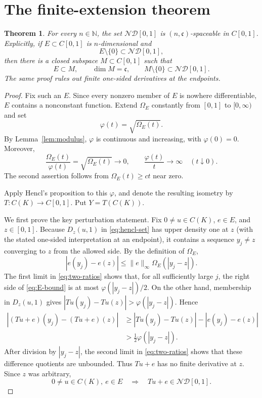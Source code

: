 \documentclass[11pt]{article}
\newtheorem{theorem}{Theorem}
\newcommand{\ND}{\mathcal{ND}[0,1]}
\newcommand{\cC}{\mathfrak c}
\begin{document}
\section{The finite-extension theorem}

\begin{theorem}\label{thm:main}
For every $n\in\mathbb N$, the set $\ND$ is $(n,\cC)$-spaceable in
$C[0,1]$.  Explicitly, if $E\subset C[0,1]$ is $n$-dimensional and
\[
                         E\setminus\{0\}\subset\ND,
\]
then there is a closed subspace $M\subset C[0,1]$ such that
\[
 E\subset M,\qquad \dim M=\cC,\qquad
 M\setminus\{0\}\subset\ND.
\]
The same proof rules out finite one-sided derivatives at the endpoints.
\end{theorem}

\begin{proof}
Fix such an $E$.  Since every nonzero member of $E$ is nowhere
differentiable, $E$ contains a nonconstant function.  Extend $\Omega_E$
constantly from $[0,1]$ to $[0,\infty)$ and set
\[
                         \varphi(t)=\sqrt{\Omega_E(t)}.
\]
By Lemma~\ref{lem:modulus}, $\varphi$ is continuous and increasing, with
$\varphi(0)=0$.  Moreover,
\begin{equation}\label{eq:two-ratios}
 \frac{\Omega_E(t)}{\varphi(t)}=\sqrt{\Omega_E(t)}\longrightarrow0,
 \qquad
 \frac{\varphi(t)}{t}\longrightarrow\infty
 \quad(t\downarrow0).
\end{equation}
The second assertion follows from $\Omega_E(t)\ge ct$ near zero.

Apply Hencl's proposition to this $\varphi$, and denote the resulting
isometry by $T:C(K)\to C[0,1]$.  Put $Y=T(C(K))$.

We first prove the key perturbation statement.  Fix $0\ne u\in C(K)$,
$e\in E$, and $z\in[0,1]$.  Because $D_z(u,1)$ in
\eqref{eq:hencl-set} has upper density one at $z$ (with the stated one-sided
interpretation at an endpoint), it contains a sequence $y_j\ne z$ converging
to $z$ from the allowed side.  By the definition of $\Omega_E$,
\begin{equation}\label{eq:E-bound}
 |e(y_j)-e(z)|\le\|e\|_\infty\Omega_E(|y_j-z|).
\end{equation}
The first limit in \eqref{eq:two-ratios} shows that, for all sufficiently
large $j$, the right side of \eqref{eq:E-bound} is at most
$\varphi(|y_j-z|)/2$.  On the other hand, membership in $D_z(u,1)$ gives
\(
 |Tu(y_j)-Tu(z)|>\varphi(|y_j-z|).
\)
Hence
\begin{align*}
 |(Tu+e)(y_j)-(Tu+e)(z)|
 &\ge |Tu(y_j)-Tu(z)|-|e(y_j)-e(z)|\\
 &>\frac12\varphi(|y_j-z|).
\end{align*}
After division by $|y_j-z|$, the second limit in
\eqref{eq:two-ratios} shows that these difference quotients are unbounded.
Thus $Tu+e$ has no finite derivative at $z$.  Since $z$ was arbitrary,
\begin{equation}\label{eq:rough-sum}
       0\ne u\in C(K),\ e\in E
       \quad\Longrightarrow\quad Tu+e\in\ND.
\end{equation}


\end{proof}
\end{document}
